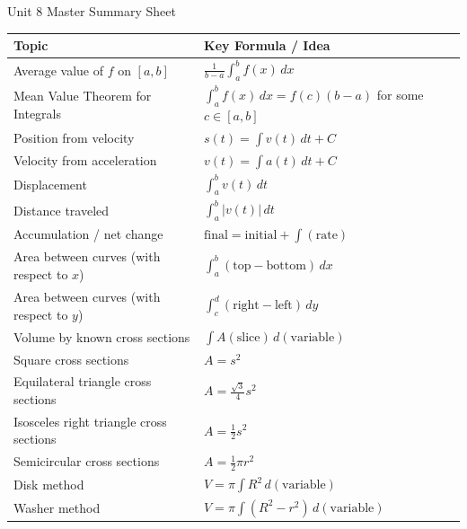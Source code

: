 \documentclass[11pt]{article}
\begin{document}
\begin{summarybox}{Unit 8 Master Summary Sheet}
\renewcommand{\arraystretch}{1.35}
\begin{tabularx}{\textwidth}{@{}p{}X@{}}
\toprule
\textbf{Topic} & \textbf{Key Formula / Idea} \\
\midrule
Average value of \(f\) on \([a,b]\) & \(\displaystyle \frac{1}{b-a}\int_a^b f(x)\,dx\) \\

Mean Value Theorem for Integrals & \(\displaystyle \int_a^b f(x)\,dx=f(c)(b-a)\) for some \(c\in[a,b]\) \\

Position from velocity & \(\displaystyle s(t)=\int v(t)\,dt + C\) \\

Velocity from acceleration & \(\displaystyle v(t)=\int a(t)\,dt + C\) \\

Displacement & \(\displaystyle \int_a^b v(t)\,dt\) \\

Distance traveled & \(\displaystyle \int_a^b |v(t)|\,dt\) \\

Accumulation / net change & \(\displaystyle \text{final}=\text{initial}+\int (\text{rate})\) \\

Area between curves (with respect to \(x\)) & \(\displaystyle \int_a^b (\text{top}-\text{bottom})\,dx\) \\

Area between curves (with respect to \(y\)) & \(\displaystyle \int_c^d (\text{right}-\text{left})\,dy\) \\

Volume by known cross sections & \(\displaystyle \int A(\text{slice})\,d(\text{variable})\) \\

Square cross sections & \(\displaystyle A=s^2\) \\

Equilateral triangle cross sections & \(\displaystyle A=\frac{\sqrt3}{4}s^2\) \\

Isosceles right triangle cross sections & \(\displaystyle A=\frac12 s^2\) \\

Semicircular cross sections & \(\displaystyle A=\frac12\pi r^2\) \\

Disk method & \(\displaystyle V=\pi\int R^2\,d(\text{variable})\) \\

Washer method & \(\displaystyle V=\pi\int (R^2-r^2)\,d(\text{variable})\) \\
\bottomrule
\end{tabularx}
\end{summarybox}
\end{document}

